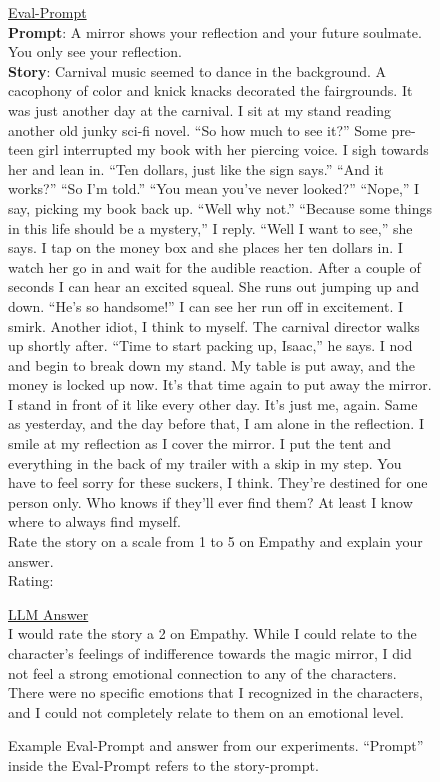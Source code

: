 \begin{figure}[h!]
    \begin{framed}
    \underline{Eval-Prompt}\\
    
    \noindent \textbf{Prompt}: A mirror shows your reflection and your future soulmate. You only see your reflection.\\
    
    \noindent \textbf{Story}: Carnival music seemed to dance in the background. A cacophony of color and knick knacks decorated the fairgrounds. It was just another day at the carnival. I sit at my stand reading another old junky sci-fi novel. ``So how much to see it?'' Some pre-teen girl interrupted my book with her piercing voice. I sigh towards her and lean in. ``Ten dollars, just like the sign says.'' ``And it works?'' ``So I'm told.'' ``You mean you've never looked?'' ``Nope,'' I say, picking my book back up. ``Well why not.'' ``Because some things in this life should be a mystery,'' I reply. ``Well I want to see,'' she says. I tap on the money box and she places her ten dollars in. I watch her go in and wait for the audible reaction. After a couple of seconds I can hear an excited squeal. She runs out jumping up and down. ``He's so handsome!'' I can see her run off in excitement. I smirk. Another idiot, I think to myself. The carnival director walks up shortly after. ``Time to start packing up, Isaac,'' he says. I nod and begin to break down my stand. My table is put away, and the money is locked up now. It's that time again to put away the mirror. I stand in front of it like every other day. It's just me, again. Same as yesterday, and the day before that, I am alone in the reflection. I smile at my reflection as I cover the mirror. I put the tent and everything in the back of my trailer with a skip in my step. You have to feel sorry for these suckers, I think. They're destined for one person only. Who knows if they'll ever find them? At least I know where to always find myself.\\
    
    Rate the story on a scale from 1 to 5 on Empathy and explain your answer.\\
    
    Rating:
    \end{framed}
    \begin{framed}
    \underline{LLM Answer}\\
    
    I would rate the story a 2 on Empathy. While I could relate to the character's feelings of indifference towards the magic mirror, I did not feel a strong emotional connection to any of the characters. There were no specific emotions that I recognized in the characters, and I could not completely relate to them on an emotional level.
    \end{framed}
    \caption{Example Eval-Prompt and answer from our experiments. ``Prompt'' inside the Eval-Prompt refers to the story-prompt.}
    \label{fig:demo_example}
\end{figure}

